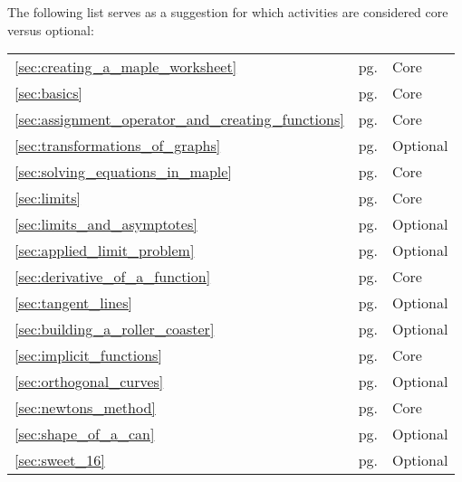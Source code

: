\documentclass{tufte-book}
\begin{document}
The following list serves as a suggestion for which activities are considered core versus optional:
\begin{table}[h]
\begin{tabular}{lll}
\ref{sec:creating_a_maple_worksheet}
\nameref{sec:creating_a_maple_worksheet}					& pg. \pageref{sec:creating_a_maple_worksheet}					& Core\\
\ref{sec:basics}
\nameref{sec:basics}										& pg. \pageref{sec:basics}										& Core\\
\ref{sec:assignment_operator_and_creating_functions}
\nameref{sec:assignment_operator_and_creating_functions}	& pg. \pageref{sec:assignment_operator_and_creating_functions}	& Core\\
\ref{sec:transformations_of_graphs}
\nameref{sec:transformations_of_graphs}						& pg. \pageref{sec:transformations_of_graphs}					& Optional\\
\ref{sec:solving_equations_in_maple}
\nameref{sec:solving_equations_in_maple}					& pg. \pageref{sec:solving_equations_in_maple}					& Core\\
\ref{sec:limits}
\nameref{sec:limits}										& pg. \pageref{sec:limits}										& Core\\
\ref{sec:limits_and_asymptotes}
\nameref{sec:limits_and_asymptotes}							& pg. \pageref{sec:limits_and_asymptotes}						& Optional\\
\ref{sec:applied_limit_problem}
\nameref{sec:applied_limit_problem}							& pg. \pageref{sec:applied_limit_problem}						& Optional\\
\ref{sec:derivative_of_a_function}
\nameref{sec:derivative_of_a_function}						& pg. \pageref{sec:derivative_of_a_function}					& Core\\
\ref{sec:tangent_lines}
\nameref{sec:tangent_lines}									& pg. \pageref{sec:tangent_lines}								& Optional\\
\ref{sec:building_a_roller_coaster}
\nameref{sec:building_a_roller_coaster}						& pg. \pageref{sec:building_a_roller_coaster}					& Optional\\
\ref{sec:implicit_functions}
\nameref{sec:implicit_functions}							& pg. \pageref{sec:implicit_functions}							& Core\\
\ref{sec:orthogonal_curves}
\nameref{sec:orthogonal_curves}								& pg. \pageref{sec:orthogonal_curves}							& Optional\\
\ref{sec:newtons_method}
\nameref{sec:newtons_method}								& pg. \pageref{sec:newtons_method}								& Core\\
\ref{sec:shape_of_a_can}
\nameref{sec:shape_of_a_can}								& pg. \pageref{sec:shape_of_a_can}								& Optional\\
\ref{sec:sweet_16}
\nameref{sec:sweet_16}										& pg. \pageref{sec:sweet_16}									& Optional
\end{tabular}
\end{table}
		
\end{document}
